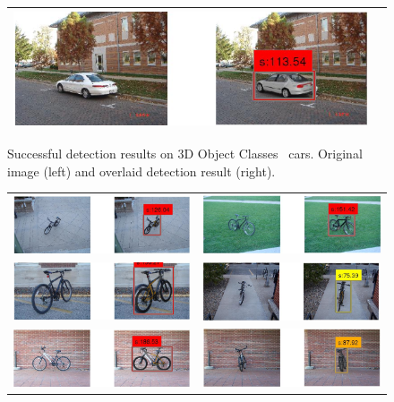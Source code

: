 \documentclass[10pt,twocolumn,letterpaper]{article}
\begin{document}
\begin{figure}[h]
\begin{tabular}{|c|c|}
  \includegraphics[width=0.40\linewidth]{supp/car31.png} \\
  \hline
  \end{tabular}
\caption{Successful detection results on 3D Object
  Classes~\cite{savarese07} cars. Original image (left) and overlaid
  detection result (right).}%
  \label{fig:3dobject_car_good}
\end{figure}

\begin{figure}[h]
\setlength\tabcolsep{1pt}
\centering
\begin{tabular}{|c|c|}
  \hline
  \includegraphics[width=0.40\linewidth]{supp/bicycle17.png} &
  \includegraphics[width=0.40\linewidth]{supp/bicycle18.png} \\
  \includegraphics[width=0.40\linewidth]{supp/bicycle13.png} &
  \includegraphics[width=0.40\linewidth]{supp/bicycle9.png} \\
  \includegraphics[width=0.40\linewidth]{supp/bicycle16.png} &
  \includegraphics[width=0.40\linewidth]{supp/bicycle12.png} \\

\end{tabular}
\end{figure}
\end{document}
